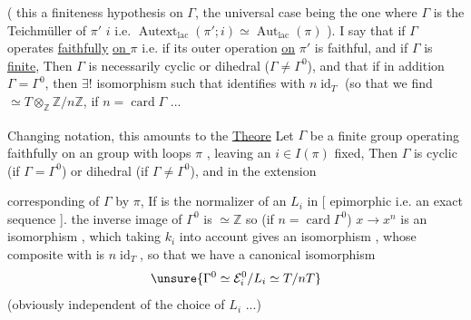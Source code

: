 ( this   a finiteness hypothesis on
$\Gamma$, the universal case being the one where $\Gamma$
is the Teichmüller  of $\pi'$  $i$
i.e. $\operatorname{Autext}_{\mathrm{lac}}(\pi';i)\simeq\operatorname{Aut}_{\mathrm{lac}}(\pi)$ ). I
say that if $\Gamma$ operates \uline{faithfully} \uline{on $\pi$}
i.e. if its outer operation \uline{on}
\uline{$\pi'$} is faithful, and if $\Gamma$ is \uline{finite},
Then $\Gamma$ is necessarily cyclic 
or dihedral ($\Gamma\ne\Gamma^0$), and that if in
addition $\Gamma=\Gamma^0$, then   $\exists!$ isomorphism
 such that  identifies with
$n\operatorname{id}_T$ (so that we find 
$\simeq T\otimes_{\mathbb Z}\mathbb Z/n\mathbb Z$, if $n=\operatorname{card}\Gamma$ ...

Changing notation, this amounts to the
\uline{Theore}\textsuperscript{} Let $\Gamma$ be a finite group operating
faithfully on an \uline{}
group with loops $\pi$ , leaving an $i\in I(\pi)$ fixed,
Then $\Gamma$ is cyclic (if $\Gamma=\Gamma^0$) or
dihedral (if $\Gamma\ne\Gamma^0$), and in the extension


corresponding   of $\Gamma$ by $\pi$,
If  is the normalizer of an $L_i$ in
 [    epimorphic i.e. an exact sequence
 ]. the inverse image  of
$\Gamma^0$ is $\simeq\mathbb Z$ so (if $n=\operatorname{card}\Gamma^0$)\inserted{\unsure{$=[\mathcal E_i^0:L_i]$}}
 $x\to x^n$ is an isomorphism  , which
taking $k_i$ into account gives an
isomorphism , whose composite with
  is $n\operatorname{id}_T$, so
that we have a canonical isomorphism
\[\unsure{\Gamma^0\simeq\mathcal E_i^0/L_i\simeq T/nT}\]
(obviously independent of the choice of $L_i$ ...)

